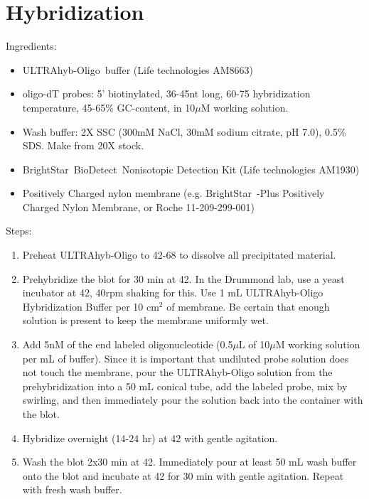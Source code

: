 \documentclass{article}
\newcommand{\mul}{\ensuremath{\mu}L\xspace}
\newcommand{\muM}{\ensuremath{\mu}M\xspace}
\newcommand{\degC}{\celsius\xspace}
\begin{document}
\section*{Hybridization}

Ingredients:

\begin{itemize}
\item ULTRAhyb-Oligo\textregistered\ buffer (Life technologies AM8663)
\item oligo-dT probes: 5' biotinylated, 36-45nt long, 60-75\degC hybridization temperature, 45-65\% GC-content, in 10\muM working solution.
\item Wash buffer: 2X SSC (300mM NaCl, 30mM sodium citrate, pH 7.0), 0.5\% SDS. Make from 20X stock. %
  \item BrightStar\textregistered\ BioDetect\texttrademark\ Nonisotopic Detection Kit (Life technologies AM1930)
  \item Positively Charged nylon membrane (e.g. BrightStar\texttrademark\ -Plus Positively Charged Nylon Membrane, or Roche 11-209-299-001)
\end{itemize}

Steps:

\begin{enumerate}[resume]
\item Preheat ULTRAhyb-Oligo to 42-68\degC to dissolve all precipitated material.
\item Prehybridize the blot for 30 min at 42\degC. In the Drummond lab, use a yeast incubator at 42\degC, 40rpm shaking for this.
Use 1 mL ULTRAhyb-Oligo Hybridization Buffer per 10 cm$^2$ of membrane. Be certain that enough solution is present to keep the membrane uniformly wet.
\item Add 5nM of the end labeled oligonucleotide (0.5\mul of 10\muM working solution per mL of buffer). 
Since it is important that undiluted probe solution does not touch the membrane, pour the ULTRAhyb-Oligo solution from the prehybridization into a 50 mL conical tube, add the labeled probe, mix by swirling, and then immediately pour the solution back into the container with the blot.
\item Hybridize overnight (14-24 hr) at 42\degC with gentle agitation.
\item Wash the blot 2x30 min at 42\degC. Immediately pour at least 50 mL wash buffer onto the blot and incubate at 42\degC for 30 min with gentle agitation. Repeat with fresh wash buffer.
\end{enumerate}
\end{document}
